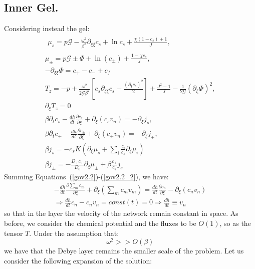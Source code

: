 \documentclass[12pt]{extarticle}
\begin{document}
\subsection{Inner Gel.}
Considering instead the gel:
\begin{gather}
\begin{aligned}
\mu_s = p \mathcal{G} - \frac{\omega^2}{\beta^2} \partial_{\xi\xi}c_s+ \ln c_s+\frac{\chi(1-c_s)+1}{J} , 
\end{aligned}\label{mus2.2}\\[2.5mm]
\mu_\pm = p \mathcal{G} \pm \Phi  + \ln (c_\pm) +\frac{1-\chi c_s}{J} ,\\
-\partial_{\xi\xi} \Phi = c_+-c_-+c_f\,\label{Poi2.2} \\
T_z= -p+\frac{\omega^2}{2\mathcal{G}\beta^2} \left[c_s\partial_{\xi\xi}c_s-\frac{(\partial_\xi c_s)^2}{2}\right]+ \frac{J^2-1}{J}-\frac{1}{2\mathcal{G}} (\partial_\xi \Phi)^2,\label{T2.2}\\
\partial_\xi T_z=0\\
\beta \partial_t c_s -\frac{dh}{dt}\frac{\partial c_s}{\partial \xi}+\partial_\xi (c_s v_n)= - \partial_\xi j_s,\label{gov2.2}\\
\beta \partial_t c_\pm -\frac{dh}{dt}\frac{\partial c_\pm}{\partial \xi}+\partial_\xi (c_\pm v_n)= -\partial_\xi j_\pm,\label{gov2.2_2}\\
\beta j_s =-c_s K  \left(\partial_\xi\mu_s +\sum_i \frac{c_i}{c_s} \partial_\xi \mu_i\right)\\
\beta j_\pm= - \frac{D_\pm c_\pm}{D_0}\partial_\xi \mu_\pm + \beta \frac{c_\pm}{c_s}j_s
\end{gather}
Summing Equations~(\ref{gov2.2})-(\ref{gov2.2_2}), we have:
\begin{equation}
\begin{aligned}
-\frac{dh}{dt}\frac{\partial \sum_m c_m}{\partial \xi}+ \partial_\xi \left(\sum_m c_m v_m\right)= \frac{dh}{dt}\frac{\partial c_n}{\partial \xi}-\partial_\xi (c_n v_n)\\
\Rightarrow  \frac{dh}{dt} c_n -c_n v_n=const(t)=0 \Rightarrow  \frac{dh}{dt} \equiv v_n
\end{aligned}
\end{equation}
so that in the layer the velocity of the network remain constant in space.
\color{red}
As before, we consider the chemical potential and the fluxes to be $O(1)$, so as the tensor $T$. Under the assumption that:
\begin{equation}
\omega^2 >> O(\beta) 
\end{equation}
we have that the Debye layer remains the smaller scale of the problem. Let us consider the following expansion of the solution:
\end{document}
